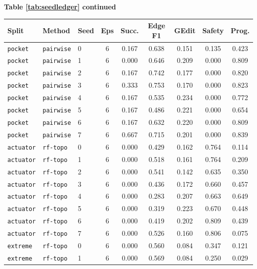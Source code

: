 \documentclass{article}
\begin{document}
\begin{center}
\textbf{Table \ref{tab:seedledger} continued}\\[0.4ex]
\begin{tabular}{lllcccccc}
\toprule
Split & Method & Seed & Eps & Succ. & Edge F1 & GEdit & Safety & Prog. \\
\midrule
\texttt{pocket} & \texttt{pairwise} & 0 & 6 & 0.167 & 0.638 & 0.151 & 0.135 & 0.423 \\
\texttt{pocket} & \texttt{pairwise} & 1 & 6 & 0.000 & 0.646 & 0.209 & 0.000 & 0.809 \\
\texttt{pocket} & \texttt{pairwise} & 2 & 6 & 0.167 & 0.742 & 0.177 & 0.000 & 0.820 \\
\texttt{pocket} & \texttt{pairwise} & 3 & 6 & 0.333 & 0.753 & 0.170 & 0.000 & 0.823 \\
\texttt{pocket} & \texttt{pairwise} & 4 & 6 & 0.167 & 0.535 & 0.234 & 0.000 & 0.772 \\
\texttt{pocket} & \texttt{pairwise} & 5 & 6 & 0.167 & 0.486 & 0.221 & 0.000 & 0.654 \\
\texttt{pocket} & \texttt{pairwise} & 6 & 6 & 0.167 & 0.632 & 0.220 & 0.000 & 0.809 \\
\texttt{pocket} & \texttt{pairwise} & 7 & 6 & 0.667 & 0.715 & 0.201 & 0.000 & 0.839 \\
\texttt{actuator} & \texttt{rf-topo} & 0 & 6 & 0.000 & 0.429 & 0.162 & 0.764 & 0.114 \\
\texttt{actuator} & \texttt{rf-topo} & 1 & 6 & 0.000 & 0.518 & 0.161 & 0.764 & 0.209 \\
\texttt{actuator} & \texttt{rf-topo} & 2 & 6 & 0.000 & 0.541 & 0.142 & 0.635 & 0.350 \\
\texttt{actuator} & \texttt{rf-topo} & 3 & 6 & 0.000 & 0.436 & 0.172 & 0.660 & 0.457 \\
\texttt{actuator} & \texttt{rf-topo} & 4 & 6 & 0.000 & 0.283 & 0.207 & 0.663 & 0.649 \\
\texttt{actuator} & \texttt{rf-topo} & 5 & 6 & 0.000 & 0.319 & 0.223 & 0.670 & 0.448 \\
\texttt{actuator} & \texttt{rf-topo} & 6 & 6 & 0.000 & 0.419 & 0.202 & 0.809 & 0.439 \\
\texttt{actuator} & \texttt{rf-topo} & 7 & 6 & 0.000 & 0.526 & 0.160 & 0.806 & 0.075 \\
\texttt{extreme} & \texttt{rf-topo} & 0 & 6 & 0.000 & 0.560 & 0.084 & 0.347 & 0.121 \\
\texttt{extreme} & \texttt{rf-topo} & 1 & 6 & 0.000 & 0.569 & 0.084 & 0.250 & 0.029 \\

\end{tabular}
\end{center}
\end{document}
